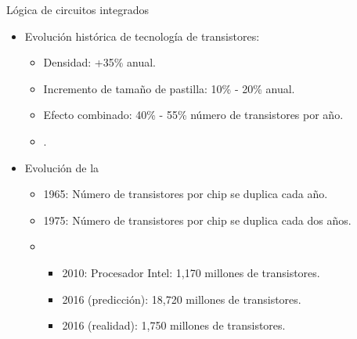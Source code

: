 \begin{frame}[t]{Lógica de circuitos integrados}
\begin{itemize}
  \item Evolución histórica de tecnología de transistores:
    \begin{itemize}
      \item Densidad: +35\% anual.
      \item Incremento de tamaño de pastilla: 10\% - 20\% anual.
      \item Efecto combinado: 40\% - 55\% número de transistores por año.
      \item {}.
    \end{itemize}

  \item Evolución de la 
    \begin{itemize}
      \item 1965: Número de transistores por chip se duplica cada año.
      \item 1975: Número de transistores por chip se duplica cada dos años.
      \item {}
        \begin{itemize}
          \item 2010: Procesador Intel: 1,170 millones de transistores.
          \item 2016 (predicción): 18,720 millones de transistores.
          \item 2016 (realidad): 1,750 millones de transistores.
        \end{itemize}
    \end{itemize}
\end{itemize}
\end{frame}

